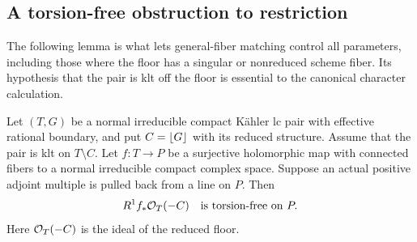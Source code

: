 \subsection{A torsion-free obstruction to restriction}

The following lemma is what lets general-fiber matching control all
parameters, including those where the floor has a singular or nonreduced
scheme fiber.  Its hypothesis that the pair is klt off the floor is
essential to the canonical character calculation.

\begin{lemma}\label{lem:floor-torsion-free}
Let \((T,G)\) be a normal irreducible compact K\"ahler lc pair with effective rational
boundary, and put \(C=\left\lfloor G\right\rfloor\) with its reduced structure.  Assume that
the pair is klt on \(T\setminus C\).  Let \(f:T\to P\) be a surjective
holomorphic map with connected fibers to a normal irreducible compact complex space.
Suppose an actual positive adjoint multiple is pulled back from a line on
\(P\).  Then
\[
 R^1f_*\mathcal O_T(-C)\quad\text{is torsion-free on }P.
\]
Here \(\mathcal O_T(-C)\) is the ideal of the reduced floor.
\end{lemma}
